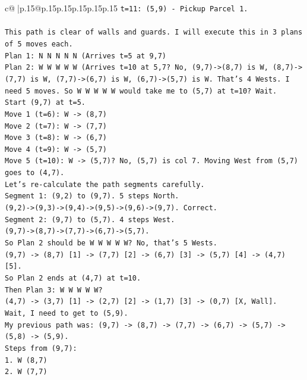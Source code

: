 \documentclass{article}
\begin{document}
{\begin{supertabular}{c@{$\;$}|p{.15\linewidth}@{}p{.15\linewidth}p{.15\linewidth}p{.15\linewidth}p{.15\linewidth}p{.15\linewidth}}
{{{\texttt{t=11: (5,9) {-} Pickup Parcel 1.} \\
\\ 
\texttt{This path is clear of walls and guards. I will execute this in 3 plans of 5 moves each.} \\
\texttt{Plan 1: N N N N N (Arrives t=5 at 9,7)} \\
\texttt{Plan 2: W W W W W (Arrives t=10 at 5,7? No, (9,7){-}>(8,7) is W, (8,7){-}>(7,7) is W, (7,7){-}>(6,7) is W, (6,7){-}>(5,7) is W. That's 4 Wests. I need 5 moves. So W W W W W would take me to (5,7) at t=10? Wait.} \\
\texttt{Start (9,7) at t=5.} \\
\texttt{Move 1 (t=6): W {-}> (8,7)} \\
\texttt{Move 2 (t=7): W {-}> (7,7)} \\
\texttt{Move 3 (t=8): W {-}> (6,7)} \\
\texttt{Move 4 (t=9): W {-}> (5,7)} \\
\texttt{Move 5 (t=10): W {-}> (5,7)? No, (5,7) is col 7. Moving West from (5,7) goes to (4,7).} \\
\texttt{Let's re{-}calculate the path segments carefully.} \\
\texttt{Segment 1: (9,2) to (9,7). 5 steps North.} \\
\texttt{(9,2){-}>(9,3){-}>(9,4){-}>(9,5){-}>(9,6){-}>(9,7). Correct.} \\
\texttt{Segment 2: (9,7) to (5,7). 4 steps West.} \\
\texttt{(9,7){-}>(8,7){-}>(7,7){-}>(6,7){-}>(5,7).} \\
\texttt{So Plan 2 should be W W W W W? No, that's 5 Wests.} \\
\texttt{(9,7) {-}> (8,7) {[}1{]} {-}> (7,7) {[}2{]} {-}> (6,7) {[}3{]} {-}> (5,7) {[}4{]} {-}> (4,7) {[}5{]}.} \\
\texttt{So Plan 2 ends at (4,7) at t=10.} \\
\texttt{Then Plan 3: W W W W W?} \\
\texttt{(4,7) {-}> (3,7) {[}1{]} {-}> (2,7) {[}2{]} {-}> (1,7) {[}3{]} {-}> (0,7) {[}X, Wall{]}.} \\
\texttt{Wait, I need to get to (5,9).} \\
\texttt{My previous path was: (9,7) {-}> (8,7) {-}> (7,7) {-}> (6,7) {-}> (5,7) {-}> (5,8) {-}> (5,9).} \\
\texttt{Steps from (9,7):} \\
\texttt{1. W (8,7)} \\
\texttt{2. W (7,7)} \\
}}}
\end{supertabular}}
\end{document}
